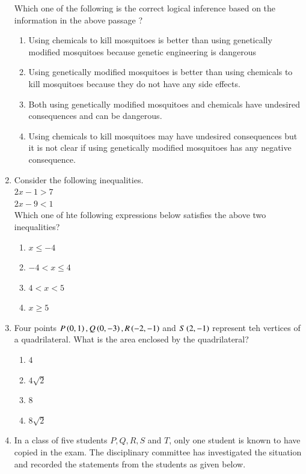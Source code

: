 \documentclass[journal]{IEEEtran}
\begin{document}
\begin{enumerate}
Which one of the following is the correct logical inference based on the information in the above passage ?
        \begin{enumerate}
            \item Using chemicals to kill mosquitoes is better than using genetically modified mosquitoes because genetic engineering is dangerous
            \item Using genetically modified mosquitoes is better than using chemicals to kill mosquitoes because they do not have any side effects.
            \item Both using genetically modified mosquitoes and chemicals have undesired consequences and can be dangerous.
            \item Using chemicals to kill mosquitoes may have undesired consequences but it is not clear if using genetically modified mosquitoes has any negative consequence.
        \end{enumerate}
	\item Consider the following inequalities.\\ 
           $2x-1> 7$\\
           $2x-9 <1$\\
          Which one of hte following expressions below satisfies the above two inequalities?
          \begin{enumerate}
              \item $x\leq -4$
              \item $-4<x \leq 4$
              \item $4<x<5$
              \item $x\geq 5$
          \end{enumerate}
	\item Four points $P\left(0,1\right),Q\left(0,-3\right),R\left(-2,-1\right)$ and $S\left(2,-1\right)$ represent teh vertices of a quadrilateral. What is the area enclosed by the quadrilateral?
    \begin{enumerate}
          \item $4$
          \item $4\sqrt{2}$
          \item $8$
          \item $8\sqrt{2}$
    \end{enumerate}
	\item In a class of five students $P,Q,R,S$ and $T$, only one student is known to have copied in the exam. The disciplinary committee has investigated the situation and recorded the statements from the students as given below.\\

\end{enumerate}
\end{document}
